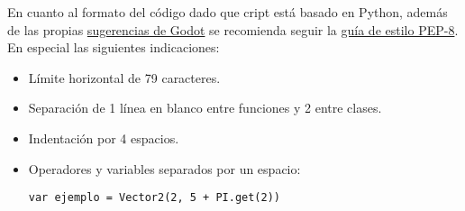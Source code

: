 En cuanto al formato del código dado que cript está basado en Python, además de las propias \href{https://docs.godotengine.org/en/stable/getting_started/scripting/gdscript/gdscript_styleguide.html}{sugerencias de Godot} se recomienda seguir la \href{https://www.python.org/dev/peps/pep-0008/}{guía de estilo PEP-8}. En especial las siguientes indicaciones:

\begin{itemize}[noitemsep]
	\item Límite horizontal de 79 caracteres. 
	\item Separación de 1 línea en blanco entre funciones y 2 entre clases.
	\item Indentación por 4 espacios.
	\item Operadores y variables separados por un espacio:
	\begin{lstlisting}
var ejemplo = Vector2(2, 5 + PI.get(2))
	\end{lstlisting}
\end{itemize}



